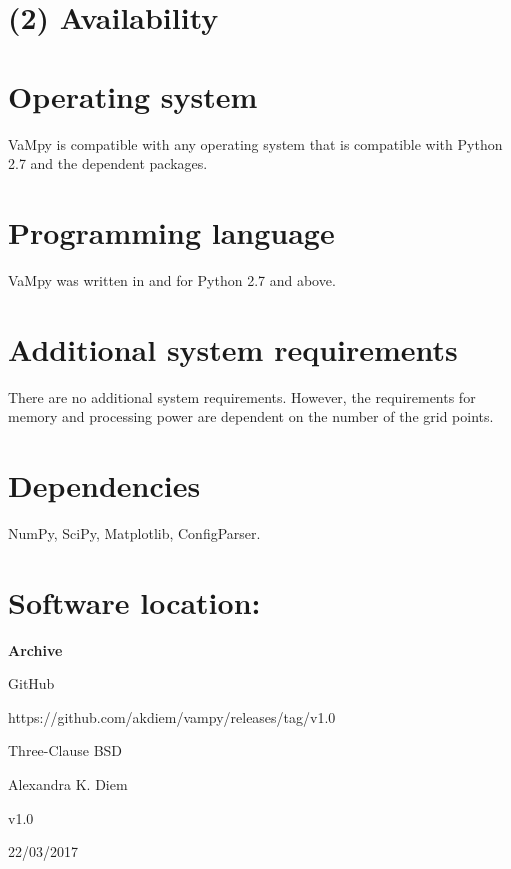 \documentclass{jors}
\begin{document}
\section*{(2) Availability}
\vspace{0.5cm}
\section*{Operating system}

VaMpy is compatible with any operating system that is compatible with Python 2.7 and the dependent packages.

\section*{Programming language}

VaMpy was written in and for Python 2.7 and above.

\section*{Additional system requirements}

There are no additional system requirements. However, the requirements for memory and processing power are dependent on the number of the grid points.

\section*{Dependencies}

NumPy, SciPy, Matplotlib, ConfigParser.

\section*{Software location:}


{\bf Archive}

\begin{description}[noitemsep,topsep=0pt]
	\item[Name:] GitHub
	\item[Persistent identifier:] https://github.com/akdiem/vampy/releases/tag/v1.0
	\item[Licence:] Three-Clause BSD
	\item[Publisher:]  Alexandra K. Diem
	\item[Version published:] v1.0
	\item[Date published:] 22/03/2017
\end{description}
\end{document}
